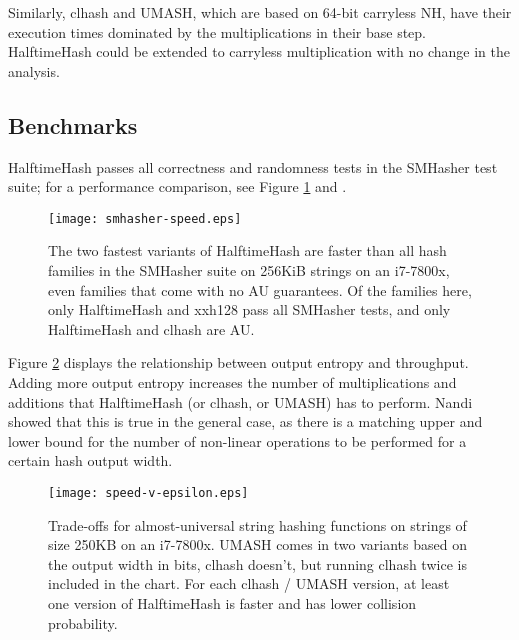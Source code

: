 \documentclass[runningheads]{llncs}
\newcommand{\ints}{\mathbb{Z}}
\begin{document}
Similarly, clhash and UMASH, which are based on 64-bit carryless NH, have their execution times dominated by the multiplications in their base step.~\cite{clhash,umash}
HalftimeHash could be extended to carryless multiplication with no change in the analysis.

\subsection{Benchmarks}


HalftimeHash passes all correctness and randomness tests in the SMHasher test suite; for a performance comparison, see Figure \ref{smhasher-speed} and \cite{smhasher}.

\begin{figure}
  \texttt{[image: smhasher-speed.eps]}
\caption{
  \label{smhasher-speed}
    The two fastest variants of HalftimeHash are faster than all hash families in the SMHasher suite on 256KiB strings on an i7-7800x, even families that come with no AU guarantees. \protect\cite{smhasher}
    Of the families here, only HalftimeHash and xxh128 pass all SMHasher tests, and only HalftimeHash and clhash are AU.
}
\end{figure}

Figure \ref{frontier} displays the relationship between output entropy and throughput.
Adding more output entropy increases the number of multiplications and additions that HalftimeHash (or clhash, or UMASH) has to perform.
Nandi showed that this is true in the general case, as there is a matching upper and lower bound for the number of non-linear operations to be performed for a certain hash output width. \cite{ehc-nandi}


\begin{figure}
\texttt{[image: speed-v-epsilon.eps]}
\caption{
  \label{frontier}
  Trade-offs for almost-universal string hashing functions on strings of size 250KB on an i7-7800x.
  UMASH comes in two variants based on the output width in bits, clhash doesn't, but running clhash twice is included in the chart.
  For each clhash / UMASH version, at least one version of HalftimeHash is faster and has lower collision probability. \protect\cite{layer-of-maxima}
}
\end{figure}
\end{document}
